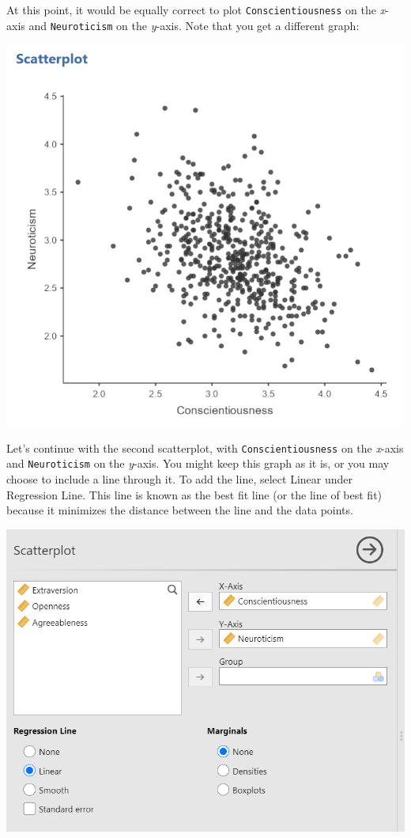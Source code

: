 \documentclass[
]{book}
\begin{document}
At this point, it would be equally correct to plot \texttt{Conscientiousness} on the \emph{x}-axis and \texttt{Neuroticism} on the \emph{y}-axis. Note that you get a different graph:

\includegraphics{img/Scatterplot2_Output.png}

Let's continue with the second scatterplot, with \texttt{Conscientiousness} on the \emph{x}-axis and \texttt{Neuroticism} on the \emph{y}-axis. You might keep this graph as it is, or you may choose to include a line through it. To add the line, select {Linear} under Regression Line. This line is known as the best fit line (or the line of best fit) because it minimizes the distance between the line and the data points.

\includegraphics{img/Scatterplot2_Commands_Line.png}
\end{document}
